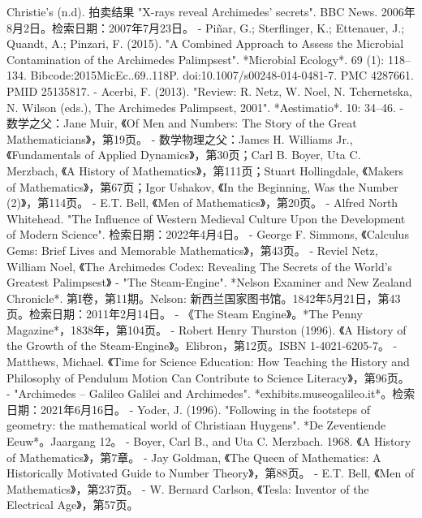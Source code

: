 \begin{enumerate}
Christie's (n.d). 拍卖结果
"X-rays reveal Archimedes' secrets". BBC News. 2006年8月2日。检索日期：2007年7月23日。
- Piñar, G.; Sterflinger, K.; Ettenauer, J.; Quandt, A.; Pinzari, F. (2015). "A Combined Approach to Assess the Microbial Contamination of the Archimedes Palimpsest". *Microbial Ecology*. 69 (1): 118–134. Bibcode:2015MicEc..69..118P. doi:10.1007/s00248-014-0481-7. PMC 4287661. PMID 25135817.
- Acerbi, F. (2013). "Review: R. Netz, W. Noel, N. Tchernetska, N. Wilson (eds.), The Archimedes Palimpsest, 2001". *Aestimatio*. 10: 34–46.
- 数学之父：Jane Muir, 《Of Men and Numbers: The Story of the Great Mathematicians》，第19页。
- 数学物理之父：James H. Williams Jr., 《Fundamentals of Applied Dynamics》，第30页；Carl B. Boyer, Uta C. Merzbach, 《A History of Mathematics》，第111页；Stuart Hollingdale, 《Makers of Mathematics》，第67页；Igor Ushakov, 《In the Beginning, Was the Number (2)》，第114页。
- E.T. Bell, 《Men of Mathematics》，第20页。
- Alfred North Whitehead. "The Influence of Western Medieval Culture Upon the Development of Modern Science". 检索日期：2022年4月4日。
- George F. Simmons, 《Calculus Gems: Brief Lives and Memorable Mathematics》，第43页。
- Reviel Netz, William Noel, 《The Archimedes Codex: Revealing The Secrets of the World's Greatest Palimpsest》
- "The Steam-Engine". *Nelson Examiner and New Zealand Chronicle*. 第I卷，第11期。Nelson: 新西兰国家图书馆。1842年5月21日，第43页。检索日期：2011年2月14日。
- 《The Steam Engine》。*The Penny Magazine*，1838年，第104页。
- Robert Henry Thurston (1996). 《A History of the Growth of the Steam-Engine》。Elibron，第12页。ISBN 1-4021-6205-7。
- Matthews, Michael. 《Time for Science Education: How Teaching the History and Philosophy of Pendulum Motion Can Contribute to Science Literacy》，第96页。
- "Archimedes – Galileo Galilei and Archimedes". *exhibits.museogalileo.it*。检索日期：2021年6月16日。
- Yoder, J. (1996). "Following in the footsteps of geometry: the mathematical world of Christiaan Huygens". *De Zeventiende Eeuw*。Jaargang 12。
- Boyer, Carl B., and Uta C. Merzbach. 1968. 《A History of Mathematics》，第7章。
- Jay Goldman, 《The Queen of Mathematics: A Historically Motivated Guide to Number Theory》，第88页。
- E.T. Bell, 《Men of Mathematics》，第237页。
- W. Bernard Carlson, 《Tesla: Inventor of the Electrical Age》，第57页。
\end{enumerate}